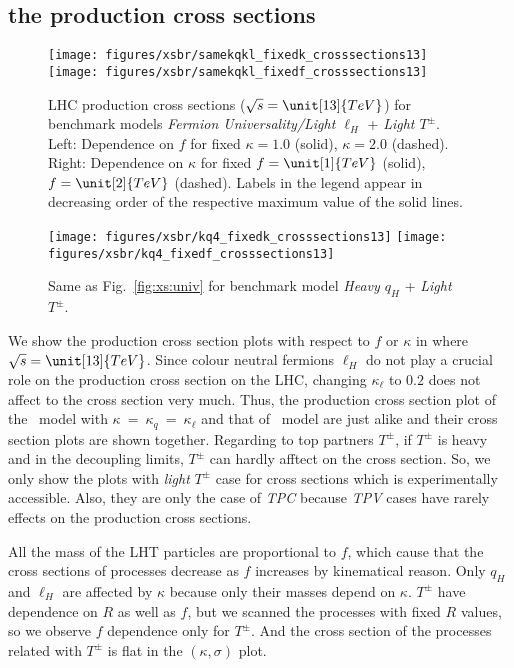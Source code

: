 \subsection{the production cross sections}
\label{sec:LHTcrosssection}
\begin{figure*}
\centering
\texttt{[image: figures/xsbr/samekqkl\_fixedk\_crosssections13]}  \quad
\texttt{[image: figures/xsbr/samekqkl\_fixedf\_crosssections13]}
\caption{LHC production cross sections ($\sqrt{s} = \unit[13]{TeV}$) for benchmark models \emph{Fermion Universality/Light $\ell_H$} + \emph{Light $T^\pm$}. 
Left: Dependence on $f$ for fixed $\kappa=1.0$ (solid), $\kappa=2.0$ (dashed). Right: Dependence on $\kappa$ for fixed $f=\unit[1]{TeV}$ (solid), $f=\unit[2]{TeV}$ (dashed).  
Labels in the legend appear in decreasing order of the respective maximum value of the solid lines.}
\label{fig:xs:univ}
\texttt{[image: figures/xsbr/kq4\_fixedk\_crosssections13]} \quad
\texttt{[image: figures/xsbr/kq4\_fixedf\_crosssections13]}
\caption{Same as Fig.~\ref{fig:xs:univ} for benchmark model \emph{Heavy $q_H$} + \emph{Light $T^\pm$}.}\label{fig:xs:kq4}
\end{figure*}
We show the production cross section plots with respect to $f$ or $\kappa$ in 
where $\sqrt{s}=\unit[13]{TeV}$. 
Since colour neutral fermions $\ell_H$ do not play a crucial role on the production cross section on the LHC, 
changing $\kappa_\ell$ to $0.2$ does not affect to the cross section very much. 
Thus, the production cross section plot of the \fu~model with $\kappa~=~\kappa_q~=~\kappa_\ell$ and that of \lil~model are just alike 
and their cross section plots are shown together. 
Regarding to top partners $T^\pm$, if $T^\pm$ is heavy and in the decoupling limits, $T^\pm$ can hardly afftect on the cross section. 
So, we only show the plots with \emph{light} $T^\pm$ case for cross sections which is experimentally accessible. 
Also, they are only the case of \emph{TPC} because \emph{TPV} cases have rarely effects on the production cross sections.


All the mass of the LHT particles are proportional to $f$, which cause that the cross sections of processes decrease as $f$ increases by kinematical reason. 
Only $q_H$ and $\ell_H$ are affected by $\kappa$ because only their masses depend on $\kappa$. 
$T^\pm$ have dependence on $R$ as well as $f$, but we scanned the processes with fixed $R$ values, 
so we observe $f$ dependence only for $T^\pm$.
And the cross section of the processes related with $T^\pm$ is flat in the $(\kappa, \sigma)$ plot.

